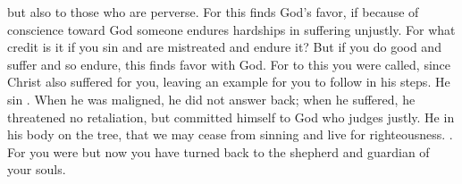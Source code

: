 {but
also
to those who are perverse.
For
this
finds God’s favor,
if
because
of conscience
toward God
someone
endures
hardships
in suffering
unjustly.
For
what
credit
is it if
you sin
and
are mistreated
and endure
it? But
if
you do good
and
suffer
and so endure,
this
finds favor
with
God.
For
to
this
you were called,
since
Christ
also
suffered
for
you,
leaving
an example
for
you to follow
in his
steps.
He
{}
sin
{}.
When
he was maligned,
he did
not
answer back;
when
he suffered,
he threatened
no
retaliation, but committed himself to God who judges
justly.
He
{}
in
his
body
on
the tree,
that
we may cease
from sinning
and live
for righteousness.
{}.
For
you were
{}
but
now
you have turned back
to
the shepherd
and
guardian
of your
souls.

}

